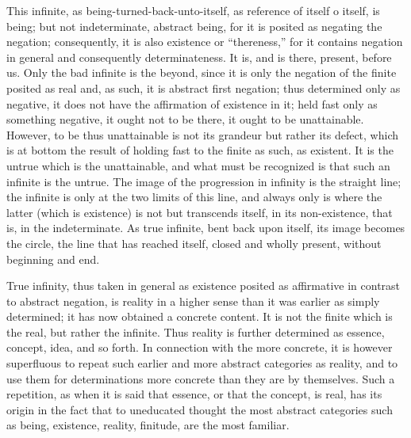 This infinite, as being-turned-back-unto-itself,
as reference of itself o itself, is being;
but not indeterminate, abstract being,
for it is posited as negating the negation;
consequently, it is also existence or “thereness,”
for it contains negation in general
and consequently determinateness.
It is, and is there, present, before us.
Only the bad infinite is the beyond,
since it is only the negation of
the finite posited as real
and, as such, it is abstract first negation;
thus determined only as negative,
it does not have the affirmation of existence in it;
held fast only as something negative,
it ought not to be there, it ought to be unattainable.
However, to be thus unattainable is
not its grandeur but rather its defect,
which is at bottom the result of holding fast
to the finite as such, as existent.
It is the untrue which is the unattainable,
and what must be recognized is that
such an infinite is the untrue.
The image of the progression in infinity is the straight line;
the infinite is only at the two limits of this line,
and always only is where the latter
(which is existence)
is not but transcends itself,
in its non-existence, that is, in the indeterminate.
As true infinite, bent back upon itself,
its image becomes the circle,
the line that has reached itself,
closed and wholly present,
without beginning and end.

True infinity, thus taken in general as existence posited
as affirmative in contrast to abstract negation,
is reality in a higher sense than it was earlier
as simply determined; it has now obtained a concrete content.
It is not the finite which is the real, but rather the infinite.
Thus reality is further determined
as essence, concept, idea, and so forth.
In connection with the more concrete,
it is however superfluous to repeat such earlier
and more abstract categories as reality,
and to use them for determinations more
concrete than they are by themselves.
Such a repetition, as when it is said that essence,
or that the concept, is real, has its origin in the fact
that to uneducated thought the most abstract categories
such as being, existence, reality, finitude, are the most familiar.

